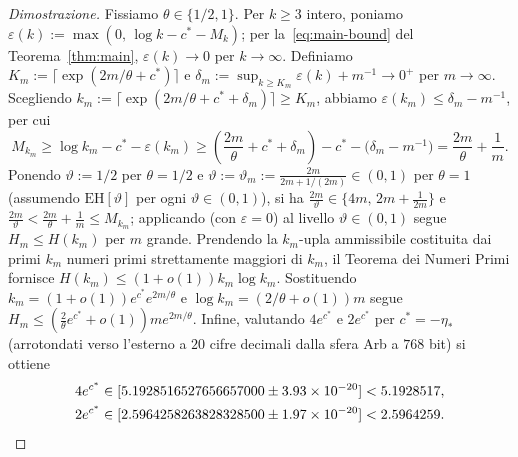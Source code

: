 \documentclass[11pt, reqno]{amsart}
\theoremstyle{remark}
\numberwithin{equation}{section}
\begin{document}
\begin{proof}[Dimostrazione]
Fissiamo $\theta \in \{1/2, 1\}$. Per $k \ge 3$ intero, poniamo
$\varepsilon(k) := \max(0,\, \log k - c^* - M_k)$; per la~\eqref{eq:main-bound} del Teorema~\ref{thm:main},
$\varepsilon(k) \to 0$ per $k \to \infty$. Definiamo $K_m := \lceil \exp(2m/\theta + c^*) \rceil$
e $\delta_m := \sup_{k \ge K_m} \varepsilon(k) + m^{-1} \to 0^+$ per $m \to \infty$.
Scegliendo $k_m := \lceil \exp(2m/\theta + c^* + \delta_m) \rceil \ge K_m$, abbiamo
$\varepsilon(k_m) \le \delta_m - m^{-1}$, per cui
\[
M_{k_m} \ge \log k_m - c^* - \varepsilon(k_m)
\ge \left(\frac{2m}{\theta} + c^* + \delta_m\right) - c^* - \bigl(\delta_m - m^{-1}\bigr)
= \frac{2m}{\theta} + \frac{1}{m}.
\]
Ponendo $\vartheta := 1/2$ per $\theta = 1/2$ e
$\vartheta := \vartheta_m := \frac{2m}{2m + 1/(2m)} \in (0, 1)$ per $\theta = 1$ (assumendo $\mathrm{EH}[\vartheta]$
per ogni $\vartheta \in (0, 1)$), si ha $\frac{2m}{\vartheta} \in \{4m,\, 2m + \frac{1}{2m}\}$ e
$\frac{2m}{\vartheta} < \frac{2m}{\theta} + \frac{1}{m} \le M_{k_m}$; applicando
\cite[Teoremi~22 e~26]{PM8b} (con $\varepsilon = 0$) al livello $\vartheta \in (0, 1)$ segue $H_m \le H(k_m)$ per $m$ grande. Prendendo la $k_m$-upla ammissibile costituita dai primi $k_m$
numeri primi strettamente maggiori di $k_m$, il Teorema dei Numeri Primi fornisce
$H(k_m) \le (1+o(1)) k_m \log k_m$. Sostituendo $k_m = (1+o(1)) e^{c^*} e^{2m/\theta}$ e
$\log k_m = (2/\theta + o(1)) m$ segue $H_m \le (\frac{2}{\theta} e^{c^*} + o(1)) m e^{2m/\theta}$.
Infine, valutando $4 e^{c^*}$ e $2 e^{c^*}$ per $c^* = -\eta_*$ (arrotondati verso l'esterno a $20$ cifre
decimali dalla sfera Arb a $768$ bit) si ottiene
\begin{align*}
4 e^{c^*} &\in [5.1928516527656657000 \pm 3.93\times 10^{-20}] < 5.1928517, \\
2 e^{c^*} &\in [2.5964258263828328500 \pm 1.97\times 10^{-20}] < 2.5964259. \qedhere
\end{align*}
\end{proof}
\end{document}
